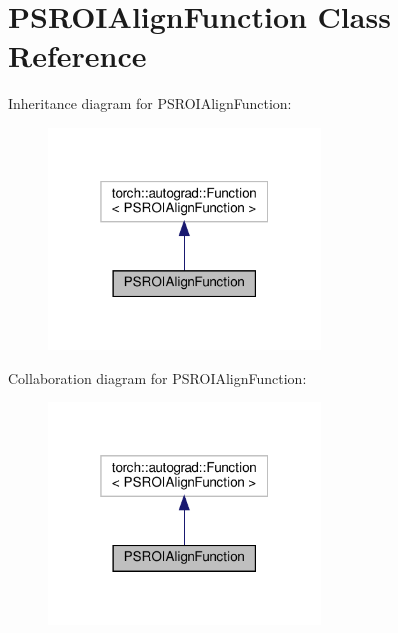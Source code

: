 \hypertarget{classPSROIAlignFunction}{}\section{P\+S\+R\+O\+I\+Align\+Function Class Reference}
\label{classPSROIAlignFunction}


Inheritance diagram for P\+S\+R\+O\+I\+Align\+Function\+:
\nopagebreak
\begin{figure}[H]
\begin{center}
\leavevmode
\includegraphics[width=205pt]{classPSROIAlignFunction__inherit__graph}
\end{center}
\end{figure}


Collaboration diagram for P\+S\+R\+O\+I\+Align\+Function\+:
\nopagebreak
\begin{figure}[H]
\begin{center}
\leavevmode
\includegraphics[width=205pt]{classPSROIAlignFunction__coll__graph}
\end{center}
\end{figure}

